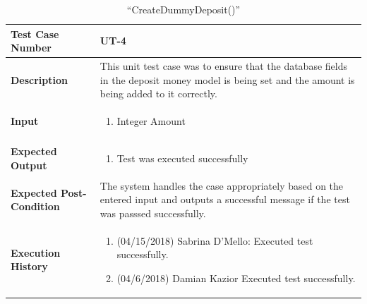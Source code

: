 \documentclass[12pt]{article}
\begin{document}
\begin{table}[H]
\caption{“CreateDummyDeposit()”}
\begin{center}
\begin{tabular}{|p{5.5cm}|p{11cm}|}
  \hline
  \bf Test Case Number & UT-4\\\hline
  \bf Description & 
This unit test case was to ensure that the database fields in the deposit money model is being set and the amount is being added to it correctly.\\\hline
  \bf Input &
  \begin{enumerate}
  \item Integer Amount
  \end{enumerate}
  \\\hline
  \bf Expected Output &
  \begin{enumerate}
  \item Test was executed successfully
  \end{enumerate}
  \\\hline
  \bf Expected Post-Condition & 
  The system handles the case appropriately based on the entered input and outputs a successful message if the test was passsed successfully.
  \\\hline   
  \bf Execution History & 
  \begin{enumerate}
  \item (04/15/2018) Sabrina D’Mello: Executed test successfully.
  \item (04/6/2018) Damian Kazior Executed test successfully.
  \end{enumerate}
  \\\hline
\end{tabular}
\end{center}
\end{table}
\end{document}

